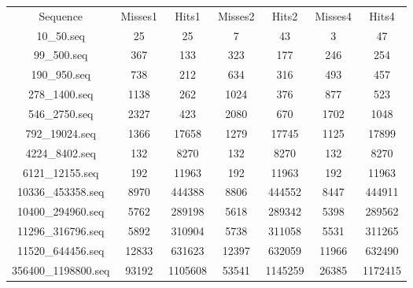 \documentclass[11pt]{article}
\begin{document}
\begin{tabular}{c|c|c|c|c|c|c}
Sequence & Misses1 & Hits1 & Misses2 & Hits2 & Misses4 & Hits4\\
10\_50.seq 			&25		&25		&7		&43		&3		&47\\
99\_500.seq 		&367	&133	&323	&177	&246	&254\\
190\_950.seq 		&738	&212	&634	&316	&493	&457\\
278\_1400.seq 		&1138	&262	&1024	&376	&877	&523\\
546\_2750.seq 		&2327	&423	&2080	&670	&1702	&1048\\
792\_19024.seq 		&1366	&17658	&1279	&17745	&1125	&17899\\
4224\_8402.seq 		&132	&8270	&132	&8270	&132	&8270\\
6121\_12155.seq 	&192	&11963	&192	&11963	&192	&11963\\
10336\_453358.seq 	&8970	&444388	&8806	&444552	&8447	&444911\\
10400\_294960.seq 	&5762	&289198	&5618	&289342	&5398	&289562\\
11296\_316796.seq 	&5892	&310904	&5738	&311058	&5531	&311265\\
11520\_644456.seq 	&12833	&631623	&12397	&632059	&11966	&632490\\ 	
356400\_1198800.seq &93192	&1105608&53541	&1145259&26385	&1172415\\
\end{tabular}
\end{document}
